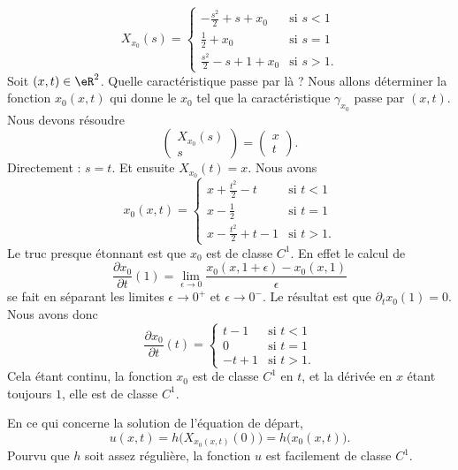 \begin{example}
	\begin{equation}
		X_{x_0}(s)=\begin{cases}
			-\frac{ s^2 }{2}+s+x_0  & \text{si }  s<1 \\
			\frac{ 1 }{2}+x_0       & \text{si } s=1  \\
			\frac{ s^2 }{2}-s+1+x_0 & \text{si } s>1.
		\end{cases}
	\end{equation}
	Soit \( (x,t)\in \eR^2\). Quelle caractéristique passe par là ? Nous allons déterminer la fonction \( x_0(x,t)\) qui donne le \( x_0\) tel que la caractéristique \( \gamma_{x_0}\) passe par \( (x,t)\). Nous devons résoudre
	\begin{equation}
		\begin{pmatrix}
			X_{x_0}(s) \\
			s
		\end{pmatrix}=\begin{pmatrix}
			x \\
			t
		\end{pmatrix}.
	\end{equation}
	Directement : \( s=t\). Et ensuite \( X_{x_0}(t)=x\). Nous avons
	\begin{equation}
		x_0(x,t)=\begin{cases}
			x+\frac{ t^2 }{2}-t   & \text{si } t<1  \\
			x-\frac{ 1 }{2}       & \text{si } t=1  \\
			x-\frac{ t^2 }{2}+t-1 & \text{si } t>1.
		\end{cases}
	\end{equation}
	Le truc presque étonnant est que \( x_0\) est de classe \( C^1\). En effet le calcul de
	\begin{equation}
		\frac{ \partial x_0 }{ \partial t }(1)=\lim_{\epsilon\to 0}\frac{ x_0(x,1+\epsilon)-x_0(x,1) }{ \epsilon }
	\end{equation}
	se fait en séparant les limites \( \epsilon\to 0^+\) et \( \epsilon\to 0^-\). Le résultat est que \( \partial_tx_0(1)=0\). Nous avons donc
	\begin{equation}
		\frac{ \partial x_0 }{ \partial t }(t)=\begin{cases}
			t-1  & \text{si } t<1 \\
			0    & \text{si } t=1 \\
			-t+1 & \text{si }t>1.
		\end{cases}
	\end{equation}
	Cela étant continu, la fonction \( x_0\) est de classe \( C^1\) en \( t\), et la dérivée en \( x\) étant toujours \( 1\), elle est de classe \( C^1\).

	En ce qui concerne la solution de l'équation de départ,
	\begin{equation}
		u(x,t)=h\big( X_{x_0(x,t)}(0) \big)=h\big( x_0(x,t) \big).
	\end{equation}
	Pourvu que \( h\) soit assez régulière, la fonction \( u\) est facilement de classe \( C^1\).
\end{example}

